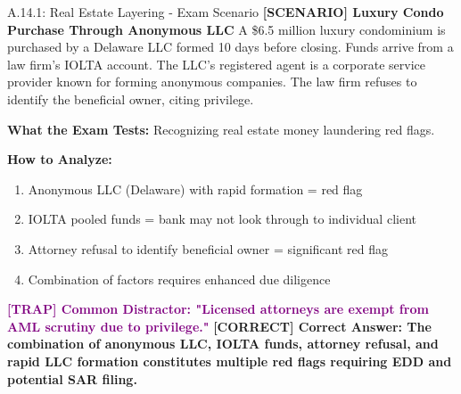 \documentclass[11pt,a4paper]{beamer}
\newcommand{\trap}[1]{\textcolor{purple}{\textbf{[TRAP] #1}}}
\newcommand{\correct}[1]{\textcolor{green!50!black}{\textbf{[CORRECT] #1}}}
\newcommand{\scenario}[1]{\textcolor{blue!70!black}{\textbf{[SCENARIO] #1}}}
\begin{document}
	\begin{frame}{A.14.1: Real Estate Layering - Exam Scenario}
		\scenario{Luxury Condo Purchase Through Anonymous LLC}
		A \$6.5 million luxury condominium is purchased by a Delaware LLC formed 10 days before closing. Funds arrive from a law firm's IOLTA account. The LLC's registered agent is a corporate service provider known for forming anonymous companies. The law firm refuses to identify the beneficial owner, citing privilege.
		
		\vspace{0.1cm}
		\textbf{What the Exam Tests:} Recognizing real estate money laundering red flags.
		
		\vspace{0.1cm}
		\textbf{How to Analyze:}
		\begin{enumerate}
			\item Anonymous LLC (Delaware) with rapid formation = red flag
			\item IOLTA pooled funds = bank may not look through to individual client
			\item Attorney refusal to identify beneficial owner = significant red flag
			\item Combination of factors requires enhanced due diligence
		\end{enumerate}
		
		\trap{Common Distractor: "Licensed attorneys are exempt from AML scrutiny due to privilege."}
		\correct{Correct Answer: The combination of anonymous LLC, IOLTA funds, attorney refusal, and rapid LLC formation constitutes multiple red flags requiring EDD and potential SAR filing.}
	\end{frame}
	
\end{document}
